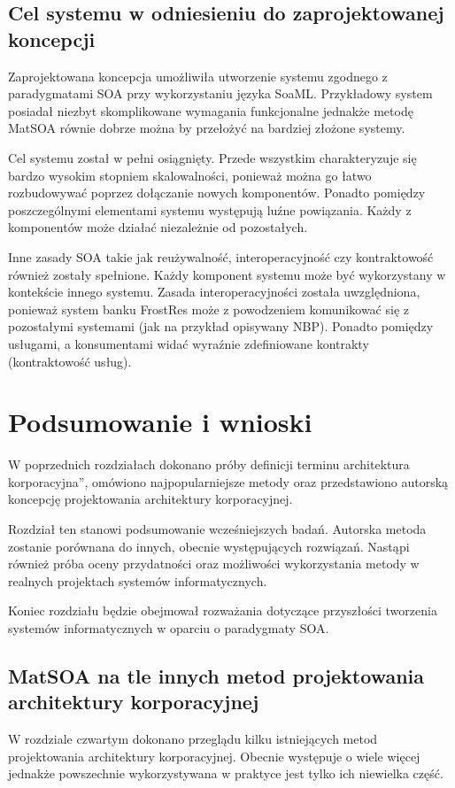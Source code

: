 \section{Cel systemu w odniesieniu do zaprojektowanej koncepcji}
Zaprojektowana koncepcja umożliwiła utworzenie systemu zgodnego z paradygmatami SOA przy wykorzystaniu języka SoaML. Przykładowy system posiadał niezbyt skomplikowane wymagania funkcjonalne jednakże metodę MatSOA równie dobrze można by przełożyć na bardziej złożone systemy.

Cel systemu został w pełni osiągnięty. Przede wszystkim charakteryzuje się bardzo wysokim stopniem skalowalności, ponieważ można go łatwo rozbudowywać poprzez dołączanie nowych komponentów. Ponadto pomiędzy poszczególnymi elementami systemu występują luźne powiązania. Każdy z komponentów może działać niezależnie od pozostałych.

Inne zasady SOA takie jak reużywalność, interoperacyjność czy kontraktowość również zostały spełnione. Każdy komponent systemu może być wykorzystany w kontekście innego systemu. Zasada interoperacyjności została uwzględniona, ponieważ system banku FrostRes może z powodzeniem komunikować się z pozostałymi systemami (jak na przykład opisywany NBP). Ponadto pomiędzy usługami, a konsumentami widać wyraźnie zdefiniowane kontrakty (kontraktowość usług).

\chapter{Podsumowanie i wnioski}
W poprzednich rozdziałach dokonano próby definicji terminu \quotedblbase architektura korporacyjna\textquotedblright, omówiono najpopularniejsze metody oraz przedstawiono autorską koncepcję projektowania architektury korporacyjnej. 

Rozdział ten stanowi podsumowanie wcześniejszych badań. Autorska metoda zostanie porównana do innych, obecnie występujących rozwiązań. Nastąpi również próba oceny przydatności oraz możliwości wykorzystania metody w realnych projektach systemów informatycznych.

Koniec rozdziału będzie obejmował rozważania dotyczące przyszłości tworzenia systemów informatycznych w oparciu o paradygmaty SOA.

\section{MatSOA na tle innych metod projektowania architektury korporacyjnej}
W rozdziale czwartym dokonano przeglądu kilku istniejących metod projektowania architektury korporacyjnej. Obecnie występuje o wiele więcej jednakże powszechnie wykorzystywana w praktyce jest tylko ich niewielka część.

